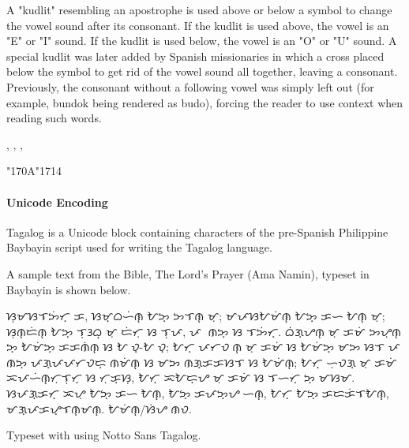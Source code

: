 A "kudlit" resembling an apostrophe is used above or below a symbol to change the vowel sound after its consonant. If the kudlit is used above, the vowel is an "E" or "I" sound. If the kudlit is used below, the vowel is an "O" or "U" sound. A special kudlit was later added by Spanish missionaries in which a cross placed below the symbol to get rid of the vowel sound all together, leaving a consonant. Previously, the consonant without a following vowel was simply left out (for example, bundok being rendered as budo), forcing the reader to use context when reading such words.

\bigskip

\centerline{
, 
,
,
}

{\tagalog \char"170A\char"1714}

\paragraph{Unicode Encoding} Tagalog is a Unicode block containing characters of the pre-Spanish Philippine Baybayin script used for writing the Tagalog language.
\medskip

\medskip

A sample text from the Bible, The Lord's Prayer (Ama Namin), typeset in Baybayin is shown below.

\bgroup\obeylines
{\tagalog

ᜐᜓᜋᜐᜎᜅᜒᜆ᜔ ᜃ,
ᜐᜋ᜔ᜊᜑᜒᜈ᜔ ᜀᜅ᜔ ᜅᜎᜈ᜔ ᜋᜓ;
ᜋᜉᜐᜀᜋᜒᜈ᜔ ᜀᜅ᜔ ᜃᜑᜍᜒᜀᜈ᜔ ᜋᜓ;
ᜐᜓᜈ᜔ᜇᜒᜈ᜔ ᜀᜅ᜔ ᜎᜓᜂᜊ᜔ ᜋᜓ
ᜇᜒᜆᜓ ᜐ ᜎᜓᜉ, ᜉᜍ ᜈᜅ᜔ ᜐ ᜎᜅᜒᜆ᜔.
ᜊᜒᜄ᜔ᜌᜈ᜔ ᜋᜓ ᜃᜋᜒ ᜅᜌᜓᜈ᜔ ᜅ᜔ ᜀᜋᜒᜅ᜔ ᜃᜃᜈᜒᜈ᜔ ᜐ ᜀᜍᜏ᜔-ᜀᜍᜏ᜔;
ᜀᜆ᜔ ᜉᜆᜏᜍᜒᜈ᜔ ᜋᜓ ᜃᜋᜒ ᜐ ᜀᜋᜒᜅ᜔ ᜋᜅ ᜐᜎ
ᜉᜍ ᜈᜅ᜔ ᜉᜄ᜔ᜉᜉᜆᜏᜇ᜔ ᜈᜋᜒᜈ᜔ ᜐ ᜋᜅ ᜈᜄ᜔ᜃᜃᜐᜎ ᜐ ᜀᜋᜒᜈ᜔;
ᜀᜆ᜔ ᜑᜓᜏᜄ᜔ ᜋᜓ ᜃᜋᜒ ᜁᜉᜑᜒᜈ᜔ᜆᜓᜎᜓᜆ᜔ ᜐ ᜆᜓᜃ᜔ᜐᜓ,
ᜀᜆ᜔ ᜁᜀᜇ᜔ᜌ ᜋᜓ ᜃᜋᜒ ᜐ ᜎᜑᜆ᜔ ᜅ᜔ ᜋᜐᜋ.
ᜐᜉᜄ᜔ᜃᜆ᜔ ᜁᜌᜓ ᜀᜅ᜔ ᜃᜑᜍᜒᜀᜈ᜔, ᜀᜅ᜔ ᜃᜉᜅ᜔ᜌᜍᜒᜑᜈ᜔, 
ᜀᜆ᜔ ᜀᜅ᜔ ᜃᜇᜃᜒᜎᜀᜈ᜔, ᜋᜄ᜔ᜉᜃᜌ᜔ᜎᜈ᜔ᜋᜈ᜔.
ᜀᜋᜒᜈ᜔/ᜐᜒᜌ ᜈᜏ.}

Typeset with  using Notto Sans Tagalog.

\egroup





